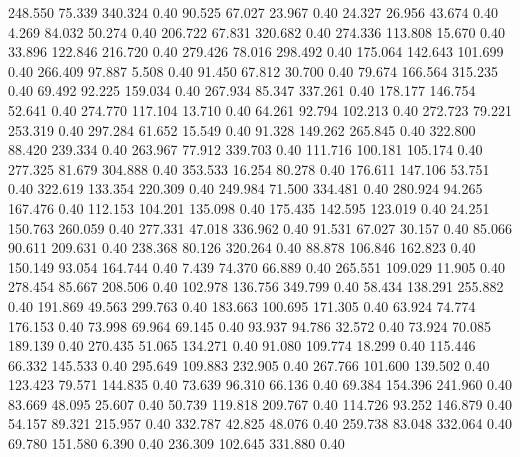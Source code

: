 248.550   75.339  340.324         0.40
  90.525   67.027   23.967         0.40
  24.327   26.956   43.674         0.40
   4.269   84.032   50.274         0.40
 206.722   67.831  320.682         0.40
 274.336  113.808   15.670         0.40
  33.896  122.846  216.720         0.40
 279.426   78.016  298.492         0.40
 175.064  142.643  101.699         0.40
 266.409   97.887    5.508         0.40
  91.450   67.812   30.700         0.40
  79.674  166.564  315.235         0.40
  69.492   92.225  159.034         0.40
 267.934   85.347  337.261         0.40
 178.177  146.754   52.641         0.40
 274.770  117.104   13.710         0.40
  64.261   92.794  102.213         0.40
 272.723   79.221  253.319         0.40
 297.284   61.652   15.549         0.40
  91.328  149.262  265.845         0.40
 322.800   88.420  239.334         0.40
 263.967   77.912  339.703         0.40
 111.716  100.181  105.174         0.40
 277.325   81.679  304.888         0.40
 353.533   16.254   80.278         0.40
 176.611  147.106   53.751         0.40
 322.619  133.354  220.309         0.40
 249.984   71.500  334.481         0.40
 280.924   94.265  167.476         0.40
 112.153  104.201  135.098         0.40
 175.435  142.595  123.019         0.40
  24.251  150.763  260.059         0.40
 277.331   47.018  336.962         0.40
  91.531   67.027   30.157         0.40
  85.066   90.611  209.631         0.40
 238.368   80.126  320.264         0.40
  88.878  106.846  162.823         0.40
 150.149   93.054  164.744         0.40
   7.439   74.370   66.889         0.40
 265.551  109.029   11.905         0.40
 278.454   85.667  208.506         0.40
 102.978  136.756  349.799         0.40
  58.434  138.291  255.882         0.40
 191.869   49.563  299.763         0.40
 183.663  100.695  171.305         0.40
  63.924   74.774  176.153         0.40
  73.998   69.964   69.145         0.40
  93.937   94.786   32.572         0.40
  73.924   70.085  189.139         0.40
 270.435   51.065  134.271         0.40
  91.080  109.774   18.299         0.40
 115.446   66.332  145.533         0.40
 295.649  109.883  232.905         0.40
 267.766  101.600  139.502         0.40
 123.423   79.571  144.835         0.40
  73.639   96.310   66.136         0.40
  69.384  154.396  241.960         0.40
  83.669   48.095   25.607         0.40
  50.739  119.818  209.767         0.40
 114.726   93.252  146.879         0.40
  54.157   89.321  215.957         0.40
 332.787   42.825   48.076         0.40
 259.738   83.048  332.064         0.40
  69.780  151.580    6.390         0.40
 236.309  102.645  331.880         0.40
